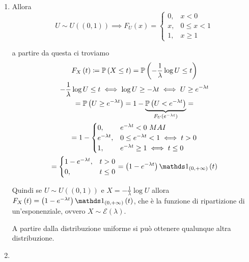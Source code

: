 \subsubsection{}
\begin{enumerate}
\item Allora
\begin{equation*}
U\sim U\left(\left( 0,1\right)\right) \implies F_{U}\left( x\right) =\begin{cases}
0, & x< 0\\
x, & 0\leq x< 1\\
1, & x\geq 1
\end{cases}
\end{equation*}

a partire da questa ci troviamo
\begin{gather*}
F_{X}\left( t\right) \coloneqq \PP\left( X\leq t\right) =\PP\left( -\frac{1}{\lambda }\log U\leq t\right)\\
-\frac{1}{\lambda }\log U\leq t\iff \log U\geq -\lambda t\iff U\geq e^{-\lambda t}\\
=\PP\left( U\geq e^{-\lambda t}\right) =1-\underbrace{\PP\left( U< e^{-\lambda t}\right)}_{F_{U}\left( e^{-\lambda t}\right)} =\\
=1-\begin{cases}
0, & e^{-\lambda t} < 0\ MAI\\
e^{-\lambda t} , & 0\leq e^{-\lambda t} < 1\iff t >0\\
1, & e^{-\lambda t} \geq 1\iff t\leq 0
\end{cases}\\
=\begin{cases}
1-e^{-\lambda t} , & t >0\\
0, & t\leq 0
\end{cases}
=\left( 1-e^{-\lambda t}\right) \Ind_{\left( 0,+\infty \right)}\left( t\right)
\end{gather*}

Quindi se $U\sim U\left(\left( 0,1\right)\right)$ e $X=-\frac{1}{\lambda }\log U$ allora $F_{X}\left( t\right) =\left( 1-e^{-\lambda t}\right) \Ind_{\left( 0,+\infty \right)}\left( t\right)$, che è la funzione di ripartizione di un'esponenziale, ovvero $X\sim \mathcal{E}\left( \lambda \right)$.

A partire dalla distribuzione uniforme si può ottenere qualunque altra distribuzione.
\item 
\end{enumerate}
\Esercizio{}

